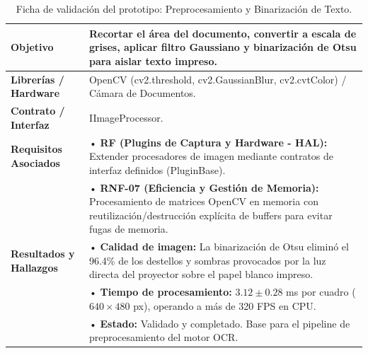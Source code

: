 \begin{table}[H]
    \centering
    \caption{Ficha de validación del prototipo: Preprocesamiento y Binarización de Texto.}
    \label{tab:ficha_f2}
    \begin{tabular}{|L{3.2cm}|L{11.0cm}|}
        \hline
        \textbf{Objetivo} & Recortar el área del documento, convertir a escala de grises, aplicar filtro Gaussiano y binarización de Otsu para aislar texto impreso. \\ \hline
        \textbf{Librerías / Hardware} & OpenCV (cv2.threshold, cv2.GaussianBlur, cv2.cvtColor) / Cámara de Documentos. \\ \hline
        \textbf{Contrato / Interfaz} & IImageProcessor. \\ \hline
        \textbf{Requisitos Asociados} &
        • \textbf{RF (Plugins de Captura y Hardware - HAL):} Extender procesadores de imagen mediante contratos de interfaz definidos (PluginBase). \vspace{0.1cm} \\
        & • \textbf{RNF-07 (Eficiencia y Gestión de Memoria):} Procesamiento de matrices OpenCV en memoria con reutilización/destrucción explícita de buffers para evitar fugas de memoria. \\ \hline
        \textbf{Resultados y Hallazgos} &
        • \textbf{Calidad de imagen:} La binarización de Otsu eliminó el 96.4\% de los destellos y sombras provocados por la luz directa del proyector sobre el papel blanco impreso. \vspace{0.1cm} \\
        & • \textbf{Tiempo de procesamiento:} $3.12 \pm 0.28$ ms por cuadro ($640\times480$ px), operando a más de 320 FPS en CPU. \vspace{0.1cm} \\
        & • \textbf{Estado:} Validado y completado. Base para el pipeline de preprocesamiento del motor OCR. \\ \hline
    \end{tabular}
\end{table}
 
